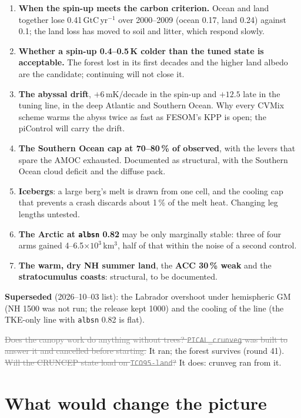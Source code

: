 \documentclass[10pt]{article}
\newcommand{\dead}[1]{\textcolor{gray}{\sout{#1}}}
\begin{document}
\begin{enumerate}\itemsep2pt
\item \textbf{When the spin-up meets the carbon criterion.} Ocean and land together lose
0.41\,GtC\,yr$^{-1}$ over 2000--2009 (ocean 0.17, land 0.24) against 0.1; the land loss has moved to
soil and litter, which respond slowly.
\item \textbf{Whether a spin-up 0.4--0.5\,K colder than the tuned state is acceptable.} The forest lost
in its first decades and the higher land albedo are the candidate; continuing will not close it.
\item \textbf{The abyssal drift}, $+6$\,mK/decade in the spin-up and $+12.5$ late in the tuning line,
in the deep Atlantic and Southern Ocean. Why every CVMix scheme warms the abyss twice as fast as FESOM's
KPP is open; the piControl will carry the drift.
\item \textbf{The Southern Ocean cap at 70--80\,\% of observed}, with the levers that spare the AMOC
exhausted. Documented as structural, with the Southern Ocean cloud deficit and the diffuse pack.
\item \textbf{Icebergs}: a large berg's melt is drawn from one cell, and the cooling cap that prevents a
crash discards about 1\,\% of the melt heat. Changing leg lengths untested.
\item \textbf{The Arctic at \texttt{albsn} 0.82} may be only marginally stable: three of four arms gained
4--6.5$\times10^3$\,km$^3$, half of that within the noise of a second control.
\item \textbf{The warm, dry NH summer land}, the \textbf{ACC 30\,\% weak} and the \textbf{stratocumulus
coasts}: structural, to be documented.
\end{enumerate}

\textbf{Superseded} (2026--10--03 list): the Labrador overshoot under hemispheric GM (NH 1500 was not run;
the release kept 1000) and the cooling of the line (the TKE-only line with \texttt{albsn} 0.82 is flat).

\dead{Does the canopy work do anything without trees? \texttt{PICAL\_crunveg} was built to answer
it and cancelled before starting.} It ran; the forest survives (round 41).
\dead{Will the CRUNCEP state load on \texttt{TCO95-land}?} It does: crunveg ran from it.

\section{What would change the picture}\label{sec:falsifiers}
\end{document}
